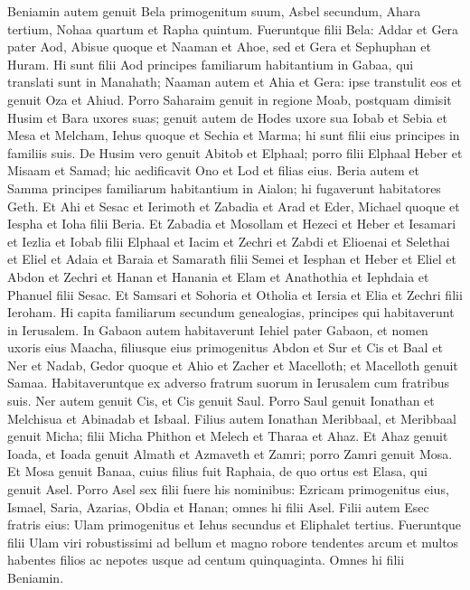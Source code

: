 \begin{biblechapter}  
\verse Beniamin autem genuit Bela primogenitum suum, Asbel secundum, Ahara tertium, 
\verse Nohaa quartum et Rapha quintum. 
\verse Fueruntque filii Bela: Addar et Gera pater Aod, 
\verse Abisue quoque et Naaman et Ahoe, 
\verse sed et Gera et Sephuphan et Huram. 
\verse Hi sunt filii Aod principes familiarum habitantium in Gabaa, qui translati sunt in Manahath; 
\verse Naaman autem et Ahia et Gera: ipse transtulit eos et genuit Oza et Ahiud. 
\verse Porro Saharaim genuit in regione Moab, postquam dimisit Husim et Bara uxores suas; 
\verse genuit autem de Hodes uxore sua Iobab et Sebia et Mesa et Melcham, 
\verse Iehus quoque et Sechia et Marma; hi sunt filii eius principes in familiis suis. 
\verse De Husim vero genuit Abitob et Elphaal; 
\verse porro filii Elphaal Heber et Misaam et Samad; hic aedificavit Ono et Lod et filias eius. 
\verse Beria autem et Samma principes familiarum habitantium in Aialon; hi fugaverunt habitatores Geth. 
\verse Et Ahi et Sesac et Ierimoth 
\verse et Zabadia et Arad et Eder, 
\verse Michael quoque et Iespha et Ioha filii Beria.  
\verse Et Zabadia et Mosollam et Hezeci et Heber 
\verse et Iesamari et Iezlia et Iobab filii Elphaal 
\verse et Iacim et Zechri et Zabdi 
\verse et Elioenai et Selethai et Eliel 
\verse et Adaia et Baraia et Samarath filii Semei 
\verse et Iesphan et Heber et Eliel 
\verse et Abdon et Zechri et Hanan 
\verse et Hanania et Elam et Anathothia 
\verse et Iephdaia et Phanuel filii Sesac. 
\verse Et Samsari et Sohoria et Otholia 
\verse et Iersia et Elia et Zechri filii Ieroham. 
\verse Hi capita familiarum secundum genealogias, principes qui habitaverunt in Ierusalem. 
\verse In Gabaon autem habitaverunt Iehiel pater Gabaon, et nomen uxoris eius Maacha, 
\verse filiusque eius primogenitus Abdon et Sur et Cis et Baal et Ner et Nadab, 
\verse Gedor quoque et Ahio et Zacher et Macelloth; 
\verse et Macelloth genuit Samaa. Habitaveruntque ex adverso fratrum suorum in Ierusalem cum fratribus suis. 
\verse Ner autem genuit Cis, et Cis genuit Saul. Porro Saul genuit Ionathan et Melchisua et Abinadab et Isbaal. 
\verse Filius autem Ionathan Meribbaal, et Meribbaal genuit Micha; 
\verse filii Micha Phithon et Melech et Tharaa et Ahaz.  
\verse Et Ahaz genuit Ioada, et Ioada genuit Almath et Azmaveth et Zamri; porro Zamri genuit Mosa. 
\verse Et Mosa genuit Banaa, cuius filius fuit Raphaia, de quo ortus est Elasa, qui genuit Asel. 
\verse Porro Asel sex filii fuere his nominibus: Ezricam primogenitus eius, Ismael, Saria, Azarias, Obdia et Hanan; omnes hi filii Asel. 
\verse Filii autem Esec fratris eius: Ulam primogenitus et Iehus secundus et Eliphalet tertius. 
\verse Fueruntque filii Ulam viri robustissimi ad bellum et magno robore tendentes arcum et multos habentes filios ac nepotes usque ad centum quinquaginta. Omnes hi filii Beniamin. 
\end{biblechapter}

